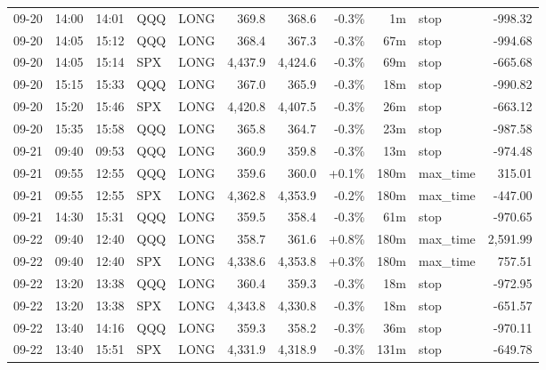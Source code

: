 \documentclass[11pt,a4paper,twoside]{article}
\begin{document}
\begin{center}
\begin{longtable}{>{\color{txtmain}}l l l l l r r r r >{\color{txtmain}}l r}
09-20 & 14:00 & 14:01 & QQQ & LONG & 369.8 & 368.6 & \textcolor{lossred}{-0.3\%} & 1m & stop & \textcolor{lossred}{-998.32} \\
09-20 & 14:05 & 15:12 & QQQ & LONG & 368.4 & 367.3 & \textcolor{lossred}{-0.3\%} & 67m & stop & \textcolor{lossred}{-994.68} \\
09-20 & 14:05 & 15:14 & SPX & LONG & 4,437.9 & 4,424.6 & \textcolor{lossred}{-0.3\%} & 69m & stop & \textcolor{lossred}{-665.68} \\
09-20 & 15:15 & 15:33 & QQQ & LONG & 367.0 & 365.9 & \textcolor{lossred}{-0.3\%} & 18m & stop & \textcolor{lossred}{-990.82} \\
09-20 & 15:20 & 15:46 & SPX & LONG & 4,420.8 & 4,407.5 & \textcolor{lossred}{-0.3\%} & 26m & stop & \textcolor{lossred}{-663.12} \\
09-20 & 15:35 & 15:58 & QQQ & LONG & 365.8 & 364.7 & \textcolor{lossred}{-0.3\%} & 23m & stop & \textcolor{lossred}{-987.58} \\
09-21 & 09:40 & 09:53 & QQQ & LONG & 360.9 & 359.8 & \textcolor{lossred}{-0.3\%} & 13m & stop & \textcolor{lossred}{-974.48} \\
09-21 & 09:55 & 12:55 & QQQ & LONG & 359.6 & 360.0 & \textcolor{wingreen}{+0.1\%} & 180m & max\_time & \textcolor{wingreen}{315.01} \\
09-21 & 09:55 & 12:55 & SPX & LONG & 4,362.8 & 4,353.9 & \textcolor{lossred}{-0.2\%} & 180m & max\_time & \textcolor{lossred}{-447.00} \\
09-21 & 14:30 & 15:31 & QQQ & LONG & 359.5 & 358.4 & \textcolor{lossred}{-0.3\%} & 61m & stop & \textcolor{lossred}{-970.65} \\
09-22 & 09:40 & 12:40 & QQQ & LONG & 358.7 & 361.6 & \textcolor{wingreen}{+0.8\%} & 180m & max\_time & \textcolor{wingreen}{2,591.99} \\
09-22 & 09:40 & 12:40 & SPX & LONG & 4,338.6 & 4,353.8 & \textcolor{wingreen}{+0.3\%} & 180m & max\_time & \textcolor{wingreen}{757.51} \\
09-22 & 13:20 & 13:38 & QQQ & LONG & 360.4 & 359.3 & \textcolor{lossred}{-0.3\%} & 18m & stop & \textcolor{lossred}{-972.95} \\
09-22 & 13:20 & 13:38 & SPX & LONG & 4,343.8 & 4,330.8 & \textcolor{lossred}{-0.3\%} & 18m & stop & \textcolor{lossred}{-651.57} \\
09-22 & 13:40 & 14:16 & QQQ & LONG & 359.3 & 358.2 & \textcolor{lossred}{-0.3\%} & 36m & stop & \textcolor{lossred}{-970.11} \\
09-22 & 13:40 & 15:51 & SPX & LONG & 4,331.9 & 4,318.9 & \textcolor{lossred}{-0.3\%} & 131m & stop & \textcolor{lossred}{-649.78} \\

\end{longtable}
\end{center}
\end{document}
